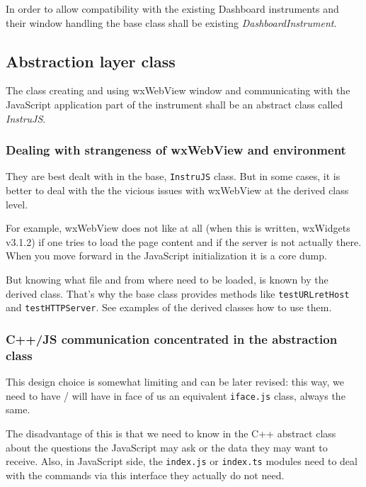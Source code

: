 \documentclass[11pt]{article}
\begin{document}
    In order to allow compatibility with the existing Dashboard instruments
and their window handling the base class shall be existing
\emph{DashboardInstrument}.

    \hypertarget{abstraction-layer-class}{%
\subsection{Abstraction layer class}\label{abstraction-layer-class}}

    The class creating and using wxWebView window and communicating with the
JavaScript application part of the instrument shall be an abstract class
called \emph{InstruJS}.

    \hypertarget{dealing-with-strangeness-of-wxwebview-and-environment}{%
\subsubsection{Dealing with strangeness of wxWebView and
environment}\label{dealing-with-strangeness-of-wxwebview-and-environment}}

    They are best dealt with in the base, \texttt{InstruJS} class. But in
some cases, it is better to deal with the the vicious issues with
wxWebView at the derived class level.

    For example, wxWebView does not like at all (when this is written,
wxWidgets v3.1.2) if one tries to load the page content and if the
server is not actually there. When you move forward in the JavaScript
initialization it is a core dump.

    But knowing what file and from where need to be loaded, is known by the
derived class. That's why the base class provides methods like
\texttt{testURLretHost} and \texttt{testHTTPServer}. See examples of the
derived classes how to use them.

    \hypertarget{cjs-communication-concentrated-in-the-abstraction-class}{%
\subsubsection{C++/JS communication concentrated in the abstraction
class}\label{cjs-communication-concentrated-in-the-abstraction-class}}

    This design choice is somewhat limiting and can be later revised: this
way, we need to have / will have in face of us an equivalent
\texttt{iface.js} class, always the same.

    The disadvantage of this is that we need to know in the C++ abstract
class about the questions the JavaScript may ask or the data they may
want to receive. Also, in JavaScript side, the \texttt{index.js} or
\texttt{index.ts} modules need to deal with the commands via this
interface they actually do not need.
\end{document}
